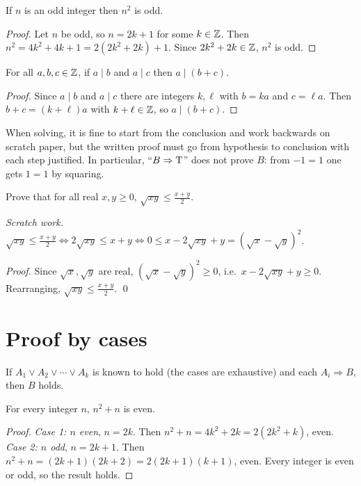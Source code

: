 \begin{proposition}
If $n$ is an odd integer then $n^2$ is odd.
\end{proposition}
\begin{proof}
Let $n$ be odd, so $n = 2k + 1$ for some $k \in \mathbb{Z}$. Then
$n^2 = 4k^2 + 4k + 1 = 2(2k^2 + 2k) + 1$. Since $2k^2+2k \in \mathbb{Z}$, $n^2$ is odd.
\end{proof}

\begin{proposition}
For all $a,b,c \in \mathbb{Z}$, if $a \mid b$ and $a \mid c$ then $a \mid (b + c)$.
\end{proposition}
\begin{proof}
Since $a \mid b$ and $a \mid c$ there are integers $k,\ell$ with $b = ka$ and $c = \ell a$.
Then $b + c = (k + \ell)a$ with $k+\ell \in \mathbb{Z}$, so $a \mid (b+c)$.
\end{proof}

\begin{important}
When solving, it is fine to start from the conclusion and work backwards on scratch paper,
but the written proof must go from hypothesis to conclusion with each step justified.
In particular, ``$B \Rightarrow \mathrm{T}$'' does not prove $B$: from $-1 = 1$ one gets $1 = 1$ by
squaring.
\end{important}

\begin{example}[AM--GM]
Prove that for all real $x,y \ge 0$, $\sqrt{xy} \le \frac{x+y}{2}$.

\emph{Scratch work.} $\sqrt{xy} \le \frac{x+y}{2} \iff 2\sqrt{xy} \le x + y \iff 0 \le x - 2\sqrt{xy}
+ y = (\sqrt{x} - \sqrt{y})^2$.

\emph{Proof.} Since $\sqrt x, \sqrt y$ are real, $(\sqrt x - \sqrt y)^2 \ge 0$, i.e.\
$x - 2\sqrt{xy} + y \ge 0$. Rearranging, $\sqrt{xy} \le \frac{x+y}{2}$. \qed
\end{example}

\section{Proof by cases}

If $A_1 \vee A_2 \vee \cdots \vee A_k$ is known to hold (the cases are exhaustive) and each
$A_i \Rightarrow B$, then $B$ holds.

\begin{proposition}
For every integer $n$, $n^2 + n$ is even.
\end{proposition}
\begin{proof}
\emph{Case 1: $n$ even}, $n = 2k$. Then $n^2 + n = 4k^2 + 2k = 2(2k^2 + k)$, even.
\emph{Case 2: $n$ odd}, $n = 2k+1$. Then $n^2 + n = (2k+1)(2k+2) = 2(2k+1)(k+1)$, even.
Every integer is even or odd, so the result holds.
\end{proof}

